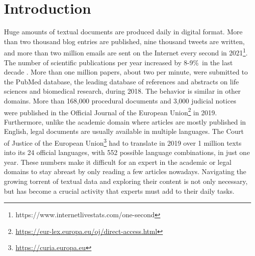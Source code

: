 

\chapter{Introduction}\label{ch:introduction}

\graphicspath{{introduction/figures/}}




Huge amounts of textual documents are produced daily in digital format. More than two thousand blog entries are published, nine thousand tweets are written, and more than two million emails are sent on the Internet every second in 2021\footnote{https://www.internetlivestats.com/one-second}. The number of scientific publications per year  increased by 8-9\%~in the last decade \citep{Ware2018STM}. More than one million papers, about two per minute,  were submitted to the PubMed database, the leading database of references and abstracts on life sciences and biomedical research, during 2018. The behavior is similar in other domains. More than 168,000 procedural documents and 3,000 judicial notices were published in the Official Journal of the European Union\footnote{\url{https://eur-lex.europa.eu/oj/direct-access.html}} in 2019. Furthermore, unlike the academic domain where articles are mostly published in English, legal documents are usually available in multiple languages. The Court of Justice of the European Union\footnote{\url{https://curia.europa.eu}} had to translate in 2019 over 1 million texts into its 24 official languages, with 552 possible language combinations, in just one year. These numbers make it difficult for an expert in the academic or legal domains to stay abreast by only reading a few articles nowadays. Navigating the growing torrent of textual data and exploring their content is not only necessary, but has become a crucial activity that experts must add to their daily tasks. 

